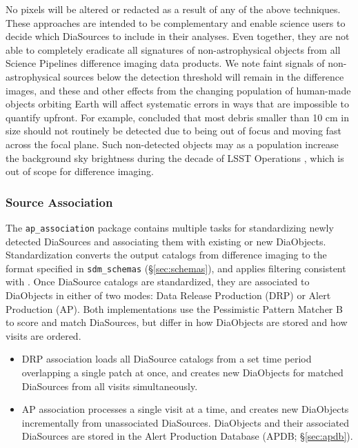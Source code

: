 No pixels will be altered or redacted as a result of any of the above techniques.
These approaches are intended to be complementary and enable science users to decide which DiaSources to include in their analyses.
Even together, they are not able to completely eradicate all signatures of non-astrophysical objects from all Science Pipelines difference imaging data products.
We note faint signals of non-astrophysical sources below the detection threshold will remain in the difference images, and these and other effects from the changing population of human-made objects orbiting Earth will affect systematic errors in ways that are impossible to quantify upfront.
For example, \citet{2024ApJ...966L..38T} concluded that most debris smaller than 10 cm in size should not routinely be detected due to being out of focus and moving fast across the focal plane.
Such non-detected objects may as a population increase the background sky brightness during the decade of LSST Operations \citep{2021MNRAS.504L..40K,2023NatAs...7..252B}, which is out of scope for difference imaging.


\subsubsection{Source Association}
\label{sec:association}

The \texttt{ap\_association} package contains multiple tasks for standardizing newly detected DiaSources and associating them with existing or new DiaObjects.
Standardization converts the output catalogs from difference imaging to the format specified in \texttt{sdm\_schemas} (\S\ref{sec:schemas}), and applies filtering consistent with \citep{DMTN-199}.
Once DiaSource catalogs are standardized, they are associated to DiaObjects in either of two modes: Data Release Production (DRP) or Alert Production (AP).
Both implementations use the Pessimistic Pattern Matcher B \citep{DMTN-031} to score and match DiaSources, but differ in how DiaObjects are stored and how visits are ordered.

\begin{itemize}
\item DRP association loads all DiaSource catalogs from a set time period overlapping a single patch at once, and creates new DiaObjects for matched DiaSources from all visits simultaneously.
\item AP association processes a single visit at a time, and creates new DiaObjects incrementally from unassociated DiaSources.
DiaObjects and their associated DiaSources are stored in the Alert Production Database (APDB; \S\ref{sec:apdb}).
\end{itemize}

